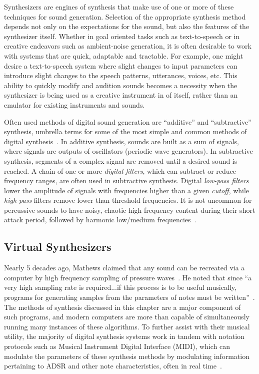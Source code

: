 \documentclass[\main/thesis.tex]{subfiles}
\begin{document}
Synthesizers are engines of synthesis that make use of one or more of these techniques for sound generation. Selection of the appropriate synthesis method depends not only on the expectations for the sound, but also the features of the synthesizer itself. Whether in goal oriented tasks such as text-to-speech or in creative endeavors such as ambient-noise generation, it is often desirable to work with systems that are quick, adaptable and tractable. For example, one might desire a text-to-speech system where slight changes to input parameters can introduce slight changes to the speech patterns, utterances, voices, etc. This ability to quickly modify and audition sounds becomes a necessity when the synthesizer is being used as a creative instrument in of itself, rather than an emulator for existing instruments and sounds. 

Often used methods of digital sound generation are \enquote{additive} and \enquote{subtractive} synthesis, umbrella terms for some of the most simple and common methods of digital synthesis~\cite{mitchell2009basicsynthChap1}. 
In additive synthesis, sounds are built as a sum of signals, where signals are outputs of oscillators (periodic wave generators).  In subtractive synthesis, segments of a complex signal are removed until a desired sound is reached. A chain of one or more \textit{digital filters}, which can subtract or reduce frequency ranges, are often used in subtractive synthesis. Digital \textit{low-pass filters} lower the amplitude of signals with frequencies higher than a given \textit{cutoff}, while \textit{high-pass} filters remove lower than threshold frequencies. It is not uncommon for percussive sounds to have noisy, chaotic high frequency content during their short attack period, followed by harmonic low/medium frequencies~\cite{lakatos2000common}.


\subsection{Virtual Synthesizers}
Nearly 5 decades ago, Mathews claimed that any sound can be recreated via a computer by high frequency sampling of pressure waves~\cite{mathews1963digital}. He noted that since \enquote{a very high sampling rate is required...if this process is to be useful musically, programs for generating samples from the parameters of notes must be written}~\cite{mathews1963digital}. The methods of synthesis discussed in this chapter are a major component of such programs, and modern computers are more than capable of simultaneously running many instances of these algorithms. To further assist with their musical utility, the majority of digital synthesis systems work in tandem with notation protocols such as Musical Instrument Digital Interface (MIDI), which can modulate the parameters of these synthesis methods by modulating information pertaining to ADSR and other note characteristics, often in real time~\cite{moog1986midi}.  
\end{document}
